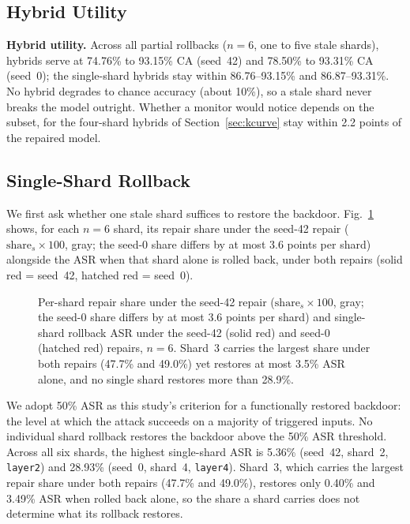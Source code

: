 \documentclass[conference,a4paper]{IEEEtran}  %
\begin{document}
\subsection{Hybrid Utility}
\label{sec:sanity}

\textbf{Hybrid utility.} Across all partial rollbacks ($n=6$, one to five stale shards), hybrids serve at 74.76\% to 93.15\% CA (seed~42) and 78.50\% to 93.31\% CA (seed~0); the single-shard hybrids stay within 86.76--93.15\% and 86.87--93.31\%. No hybrid degrades to chance accuracy (about 10\%), so a stale shard never breaks the model outright. Whether a monitor would notice depends on the subset, for the four-shard hybrids of Section~\ref{sec:kcurve} stay within 2.2 points of the repaired model.


\subsection{Single-Shard Rollback}
\label{sec:singleshard}
We first ask whether one stale shard suffices to restore the backdoor. Fig.~\ref{fig:singleshard} shows, for each $n\!=\!6$ shard, its repair share under the seed-42 repair ($\mathrm{share}_s \times 100$, gray; the seed-0 share differs by at most 3.6 points per shard) alongside the ASR when that shard alone is rolled back, under both repairs (solid red = seed~42, hatched red = seed~0).

\begin{figure}[t]
\centering

\caption{Per-shard repair share under the seed-42 repair ($\mathrm{share}_s \times 100$, gray; the seed-0 share differs by at most 3.6 points per shard) and single-shard rollback ASR under the seed-42 (solid red) and seed-0 (hatched red) repairs, $n=6$. Shard~3 carries the largest share under both repairs (47.7\% and 49.0\%) yet restores at most 3.5\% ASR alone, and no single shard restores more than 28.9\%.}
\label{fig:singleshard}
\end{figure}


We adopt 50\% ASR as this study's criterion for a functionally restored
backdoor: the level at which the attack succeeds on a majority of
triggered inputs.
No individual shard rollback restores the backdoor above the 50\% ASR threshold. Across all six shards, the highest single-shard ASR is 5.36\% (seed~42, shard~2, \texttt{layer2}) and 28.93\% (seed~0, shard~4, \texttt{layer4}). Shard~3, which carries the largest repair share under both repairs (47.7\% and 49.0\%), restores only 0.40\% and 3.49\% ASR when rolled back alone, so the share a shard carries does not determine what its rollback restores.
\end{document}

